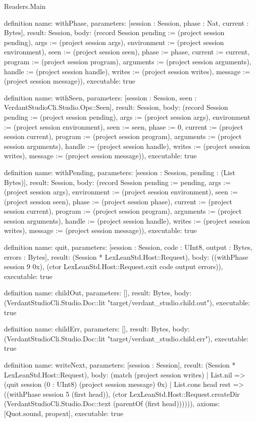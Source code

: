 \begin{lexlean}{Readers.Main}
\begin{semanticmodule}
definition{
  name: withPhase,
  parameters: [session : Session, phase : Nat, current : Bytes],
  result: Session,
  body: (record Session {pending := (project session pending), args := (project session args), environment := (project session environment), seen := (project session seen), phase := phase, current := current, program := (project session program), arguments := (project session arguments), handle := (project session handle), writes := (project session writes), message := (project session message)}),
  executable: true
}

definition{
  name: withSeen,
  parameters: [session : Session, seen : VerdantStudioCli.Studio.Ops::Seen],
  result: Session,
  body: (record Session {pending := (project session pending), args := (project session args), environment := (project session environment), seen := seen, phase := 0, current := (project session current), program := (project session program), arguments := (project session arguments), handle := (project session handle), writes := (project session writes), message := (project session message)}),
  executable: true
}

definition{
  name: withPending,
  parameters: [session : Session, pending : (List Bytes)],
  result: Session,
  body: (record Session {pending := pending, args := (project session args), environment := (project session environment), seen := (project session seen), phase := (project session phase), current := (project session current), program := (project session program), arguments := (project session arguments), handle := (project session handle), writes := (project session writes), message := (project session message)}),
  executable: true
}


definition{
  name: quit,
  parameters: [session : Session, code : UInt8, output : Bytes, errors : Bytes],
  result: (Session * LexLeanStd.Host::Request),
  body: ((withPhase session 9 0x), (ctor LexLeanStd.Host::Request.exit code output errors)),
  executable: true
}

definition{
  name: childOut,
  parameters: [],
  result: Bytes,
  body: (VerdantStudioCli.Studio.Doc::lit "target/verdant_studio.child.out"),
  executable: true
}

definition{
  name: childErr,
  parameters: [],
  result: Bytes,
  body: (VerdantStudioCli.Studio.Doc::lit "target/verdant_studio.child.err"),
  executable: true
}

definition{
  name: writeNext,
  parameters: [session : Session],
  result: (Session * LexLeanStd.Host::Request),
  body: (match (project session writes)
    | List.nil => (quit session (0 : UInt8) (project session message) 0x)
    | List.cons head rest => ((withPhase session 5 (first head)), (ctor LexLeanStd.Host::Request.createDir (VerdantStudioCli.Studio.Doc::text (parentOf (first head)))))),
  axioms: [Quot.sound, propext],
  executable: true
}


\end{semanticmodule}
\end{lexlean}
